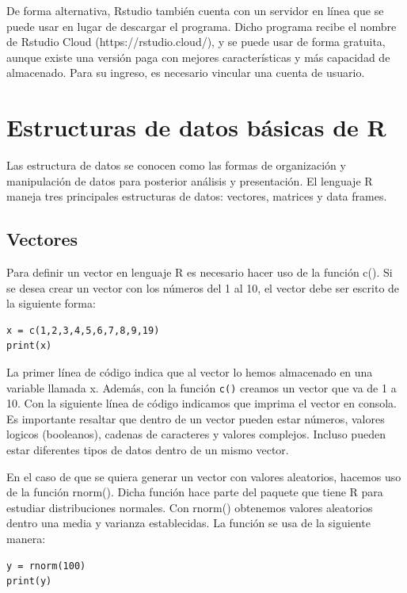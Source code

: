 \documentclass[twoside,twocolumn]{article}
\newcommand{\code}{\lstinline}
\begin{document}
De forma alternativa, Rstudio también cuenta con un servidor en línea que se puede usar en lugar de descargar el programa. Dicho programa recibe el nombre de Rstudio Cloud (https://rstudio.cloud/), y se puede usar de forma gratuita, aunque existe una versión paga con mejores características y más capacidad de almacenado. Para su ingreso, es necesario vincular una cuenta de usuario. 

\section{Estructuras de datos básicas de R}

Las estructura de datos se conocen como las formas de organización y manipulación de datos para posterior análisis y presentación. El lenguaje R maneja tres principales estructuras de datos: vectores, matrices y data frames. 

\subsection{Vectores}

Para definir un vector en lenguaje R es necesario hacer uso de la función c(). Si se desea crear un vector con los números del 1 al 10, el vector debe ser escrito de la siguiente forma:\\
\begin{verbatim}
x = c(1,2,3,4,5,6,7,8,9,19)
print(x)
\end{verbatim}

La primer línea de código indica que al vector lo hemos almacenado en una variable llamada x. Además, con la función \code{c()} creamos un vector que va de 1 a 10. Con la siguiente línea de código indicamos que imprima el vector en consola.  \newline
Es importante resaltar que dentro de un vector pueden estar números, valores logicos (booleanos), cadenas de caracteres y valores complejos. Incluso pueden estar diferentes tipos de datos dentro de un mismo vector. \break

En el caso de que se quiera generar un vector con valores aleatorios, hacemos uso de la función rnorm(). Dicha función hace parte del paquete que tiene R para estudiar distribuciones normales. Con rnorm() obtenemos valores aleatorios dentro una media y varianza establecidas.  La función se usa de la siguiente manera:\\
\begin{verbatim}
y = rnorm(100)
print(y)    
\end{verbatim}
\end{document}
